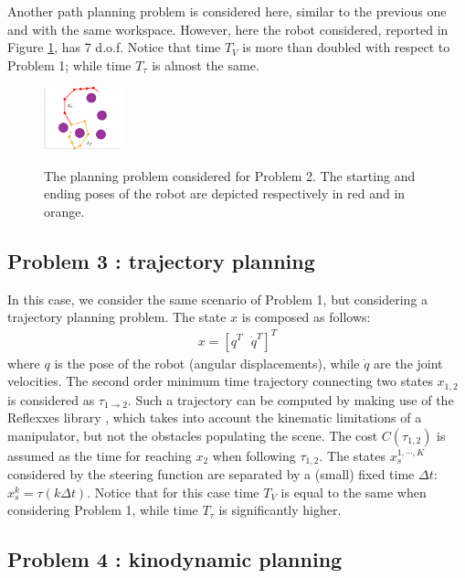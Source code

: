 Another path planning problem is considered here, similar to the previous one and with the same workspace. 
However, here the robot considered, reported in Figure \ref{fig:Problem_2}, has 7 d.o.f. 
Notice that time $T_V$ is more than doubled with respect to Problem 1; while time $T_{\tau}$ is almost the same.    

\begin{figure}
	\centering
	\includegraphics[width=0.2\textwidth]{Immagini/pdf/problem_7gdl.eps} \label{fig:Problem_A_01}
\caption{The planning problem considered for Problem 2. The starting and ending poses of the robot are depicted respectively in red and in orange. }
	\label{fig:Problem_2}
\end{figure}

\subsection{Problem 3 : trajectory planning}
\label{sec:probl_3}

In this case, we consider the same scenario of Problem 1, but considering a trajectory planning problem.
The state $x$ is composed as follows:
\begin{eqnarray}
x=[ q^{T} \,\,\,\, \dot{q}^{T} ]^{T}
\end{eqnarray}
where $q$ is the pose of the robot (angular displacements), while $\dot{q}$ are the joint velocities. The second order minimum time trajectory connecting two states $x_{1,2}$ is considered as $\tau_{1 \rightarrow 2}$. Such a trajectory can be computed by making use of the Reflexxes library \cite{Reflexxes}, which takes into account the kinematic limitations of a manipulator, but not the obstacles populating the scene. The cost $C(\tau_{1,2})$ is assumed  as the time for reaching $x_2$ when following $\tau_{1,2}$. The states $x^{1,\cdots,K}_s$ considered by the steering function are separated by a (small) fixed time $\Delta t$: $x^{k}_s = \tau(k \Delta t)$.
Notice that for this case time $T_V$ is equal to the same when considering Problem 1, while time $T_{\tau}$ is significantly higher.

\subsection{Problem 4 : kinodynamic planning}
\label{sec:probl_4}

